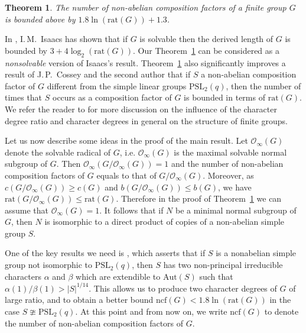 \documentclass[12pt]{amsart}
\newtheorem{theorem}{Theorem}
\theoremstyle{definition}
\theoremstyle{remark}
\begin{document}
\begin{theorem}\label{theorem-main} The number of non-abelian composition factors of a
finite group $G$ is bounded above by $1.8\ln({{\mathrm {rat}}}(G))+1.3$.
\end{theorem}

In \cite[Theorem C]{Isaacs2}, I.\,M.~Isaacs has shown that if $G$ is
solvable then the derived length of $G$ is bounded by
$3+4\log_2({{\mathrm {rat}}}(G))$. Our Theorem~\ref{theorem-main} can be
considered as a \emph{nonsolvable} version of Isaacs's result.
Theorem~\ref{theorem-main} also significantly improves a result of
J.\,P.~Cossey and the second author \cite[Theorem~A]{Cossey-Nguyen}
that if $S$ a non-abelian composition factor of $G$ different from
the simple linear groups ${{\mathrm {PSL}}}_2(q)$, then the number of times that
$S$ occurs as a composition factor of $G$ is bounded in terms of
${{\mathrm {rat}}}(G)$. We refer the reader to
\cite{Cossey-Nguyen,Lewis,Maroti-Nguyen,Moreto-Nguyen} for more
discussion on the influence of the character degree ratio and
character degrees in general on the structure of finite groups.

Let us now describe some ideas in the proof of the main result. Let
${{\mathcal{O}_\infty}}(G)$ denote the solvable radical of $G$, i.e. ${{\mathcal{O}_\infty}}(G)$
is the maximal solvable normal subgroup of $G$. Then
${{\mathcal{O}_\infty}}(G/{{\mathcal{O}_\infty}}(G))=1$ and the number of non-abelian composition
factors of $G$ equals to that of $G/{{\mathcal{O}_\infty}}(G)$. Moreover, as
$c(G/{{\mathcal{O}_\infty}}(G))\geq c(G)$ and $b(G/{{\mathcal{O}_\infty}}(G))\leq b(G)$, we have
${{\mathrm {rat}}}(G/{{\mathcal{O}_\infty}}(G))\leq {{\mathrm {rat}}}(G)$. Therefore in the proof of
Theorem~\ref{theorem-main} we can assume that ${{\mathcal{O}_\infty}}(G)=1$. It
follows that if $N$ be a minimal normal subgroup of $G$, then $N$ is
isomorphic to a direct product of copies of a non-abelian simple
group $S$.

One of the key results we need is \cite[Theorem~1]{Cossey-Nguyen},
which asserts that if $S$ is a nonabelian simple group not
isomorphic to ${{\mathrm {PSL}}}_2(q)$, then $S$ has two non-principal
irreducible characters $\alpha$ and $\beta$ which are extendible to
${{\mathrm {Aut}}}(S)$ such that $\alpha(1)/\beta(1)>|S|^{1/14}.$ This allows us
to produce two character degrees of $G$ of large ratio, and to
obtain a better bound ${{\mathrm {ncf}}}(G)<1.8\ln({{\mathrm {rat}}}(G))$ in the case
$S\ncong{{\mathrm {PSL}}}_2(q)$. At this point and from now on, we write
${{\mathrm {ncf}}}(G)$ to denote the number of non-abelian composition factors of
$G$.
\end{document}
